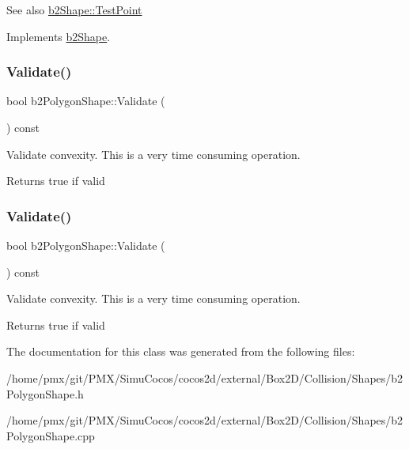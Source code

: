 \begin{DoxySeeAlso}{See also}
\hyperlink{classb2Shape_a6ac968e403e2d93e8ae46d728a2e50fa}{b2\+Shape\+::\+Test\+Point} 
\end{DoxySeeAlso}


Implements \hyperlink{classb2Shape_a6ac968e403e2d93e8ae46d728a2e50fa}{b2\+Shape}.

\mbox{\label{classb2PolygonShape_a135f4c20e17f10479e08f7befbd4d1f0}} 
\subsubsection{\texorpdfstring{Validate()}{Validate()}\hspace{0.1cm}{\footnotesize\ttfamily [1/2]}}
{\footnotesize\ttfamily bool b2\+Polygon\+Shape\+::\+Validate (\begin{DoxyParamCaption}{ }\end{DoxyParamCaption}) const}

Validate convexity. This is a very time consuming operation. \begin{DoxyReturn}{Returns}
true if valid 
\end{DoxyReturn}
\mbox{\label{classb2PolygonShape_a135f4c20e17f10479e08f7befbd4d1f0}} 
\subsubsection{\texorpdfstring{Validate()}{Validate()}\hspace{0.1cm}{\footnotesize\ttfamily [2/2]}}
{\footnotesize\ttfamily bool b2\+Polygon\+Shape\+::\+Validate (\begin{DoxyParamCaption}{ }\end{DoxyParamCaption}) const}

Validate convexity. This is a very time consuming operation. \begin{DoxyReturn}{Returns}
true if valid 
\end{DoxyReturn}


The documentation for this class was generated from the following files\+:\begin{DoxyCompactItemize}
\item 
/home/pmx/git/\+P\+M\+X/\+Simu\+Cocos/cocos2d/external/\+Box2\+D/\+Collision/\+Shapes/b2\+Polygon\+Shape.\+h\item 
/home/pmx/git/\+P\+M\+X/\+Simu\+Cocos/cocos2d/external/\+Box2\+D/\+Collision/\+Shapes/b2\+Polygon\+Shape.\+cpp\end{DoxyCompactItemize}
